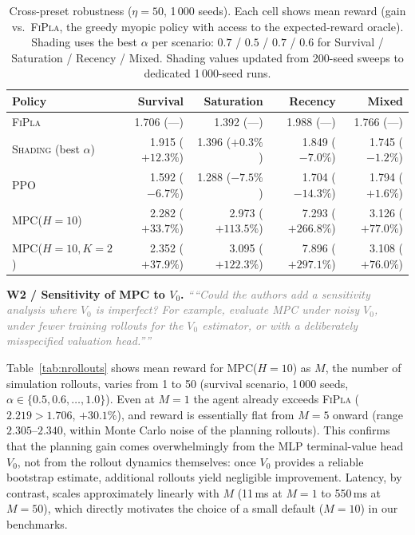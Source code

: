\documentclass[11pt]{article}
\newcommand{\reviewer}[1]{\textit{\textcolor{gray}{``#1''}}}
\begin{document}
\begin{table}[H]
\centering
\small
\caption{Cross-preset robustness ($\eta{=}50$, 1\,000 seeds).
         Each cell shows mean reward (gain vs.\ \textsc{FiPla},
         the greedy myopic policy with access to the expected-reward oracle).
         Shading uses the best $\alpha$ per scenario:
         $0.7$ / $0.5$ / $0.7$ / $0.6$ for
         Survival / Saturation / Recency / Mixed.
         Shading values updated from 200-seed sweeps to dedicated 1\,000-seed runs.}

\label{tab:robustness}
\begin{tabular}{lrrrr}
\toprule
Policy & Survival & Saturation & Recency & Mixed \\
\midrule
\textsc{FiPla}
  & 1.706 ({---})
  & 1.392 ({---})
  & 1.988 ({---})
  & 1.766 ({---}) \\
\midrule
\textsc{Shading} (best $\alpha$)
  & 1.915 ($+12.3\%$)
  & 1.396 ($+0.3\%$)
  & 1.849 ($-7.0\%$)
  & 1.745 ($-1.2\%$) \\
\textsc{PPO}
  & 1.592 ($-6.7\%$)
  & 1.288 ($-7.5\%$)
  & 1.704 ($-14.3\%$)
  & 1.794 ($+1.6\%$) \\
\midrule
\textsc{MPC}($H{=}10$)
  & 2.282 ($+33.7\%$)
  & 2.973 ($+113.5\%$)
  & 7.293 ($+266.8\%$)
  & 3.126 ($+77.0\%$) \\
\textsc{MPC}($H{=}10,K{=}2$)
  & 2.352 ($+37.9\%$)
  & 3.095 ($+122.3\%$)
  & 7.896 ($+297.1\%$)
  & 3.108 ($+76.0\%$) \\
\bottomrule
\end{tabular}
\end{table}



\noindent\textbf{W2 / Sensitivity of MPC to $V_0$.}\quad
\reviewer{``Could the authors add a sensitivity analysis where $V_0$ is imperfect?
For example, evaluate MPC under noisy $V_0$, under fewer training rollouts for
the $V_0$ estimator, or with a deliberately misspecified valuation head.''}

Table~\ref{tab:nrollouts} shows mean reward for \textsc{MPC}($H{=}10$) as $M$, the number of simulation rollouts,  varies
from 1 to 50 (survival scenario, 1\,000 seeds, $\alpha\in\{0.5,0.6,\ldots,1.0\}$).
Even at $M{=}1$ the agent already exceeds \textsc{FiPla} ($2.219 > 1.706$, $+30.1\%$),
and reward is essentially flat from $M{=}5$ onward (range $2.305$--$2.340$, within
Monte Carlo noise of the planning rollouts).
This confirms that the planning gain comes overwhelmingly from the MLP terminal-value
head $V_0$, not from the rollout dynamics themselves: once $V_0$ provides a reliable
bootstrap estimate, additional rollouts yield negligible improvement.
Latency, by contrast, scales approximately linearly with $M$ (11\,ms at $M{=}1$
to 550\,ms at $M{=}50$), which directly motivates the choice of a small default
($M{=}10$) in our benchmarks.
\end{document}
